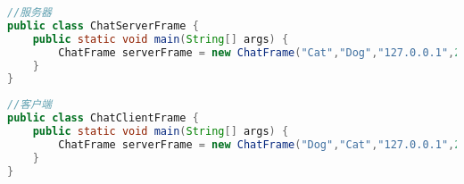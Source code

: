 \begin{lstlisting}[language=java,frame=none]
//服务器
public class ChatServerFrame {
	public static void main(String[] args) {
		ChatFrame serverFrame = new ChatFrame("Cat","Dog","127.0.0.1",2009,true);
	}
}
\end{lstlisting}
\begin{lstlisting}[language=java,frame=none]
//客户端
public class ChatClientFrame {
	public static void main(String[] args) {
		ChatFrame serverFrame = new ChatFrame("Dog","Cat","127.0.0.1",2009,false);
	}
}
\end{lstlisting}